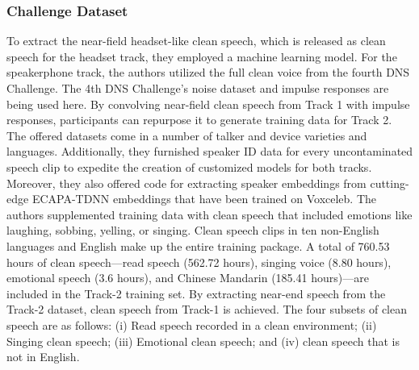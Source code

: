 \subsubsection{Challenge Dataset}
To extract the near-field headset-like clean speech, which is released as clean speech for the headset track, they employed a machine learning model. For the speakerphone track, the authors utilized the full clean voice from the fourth DNS Challenge.
The 4th DNS Challenge's noise dataset and impulse responses are being used here.
By convolving near-field clean speech from Track 1 with impulse responses, participants can repurpose it to generate training data for Track 2. The offered datasets come in a number of talker and device varieties and languages.
Additionally, they furnished speaker ID data for every uncontaminated speech clip to expedite the creation of customized models for both tracks. Moreover, they also offered code for extracting speaker embeddings from cutting-edge ECAPA-TDNN embeddings that have been trained on Voxceleb. The authors supplemented training data with clean speech that included emotions like laughing, sobbing, yelling, or singing. Clean speech clips in ten non-English languages and English make up the entire training package.
A total of 760.53 hours of clean speech—read speech (562.72 hours), singing voice (8.80 hours), emotional speech (3.6 hours), and Chinese Mandarin (185.41 hours)—are included in the Track-2 training set. By extracting near-end speech from the Track-2 dataset, clean speech from Track-1 is achieved. The four subsets of clean speech are as follows: (i) Read speech recorded in a clean environment; (ii) Singing clean speech; (iii) Emotional clean speech; and (iv) clean speech that is not in English.

